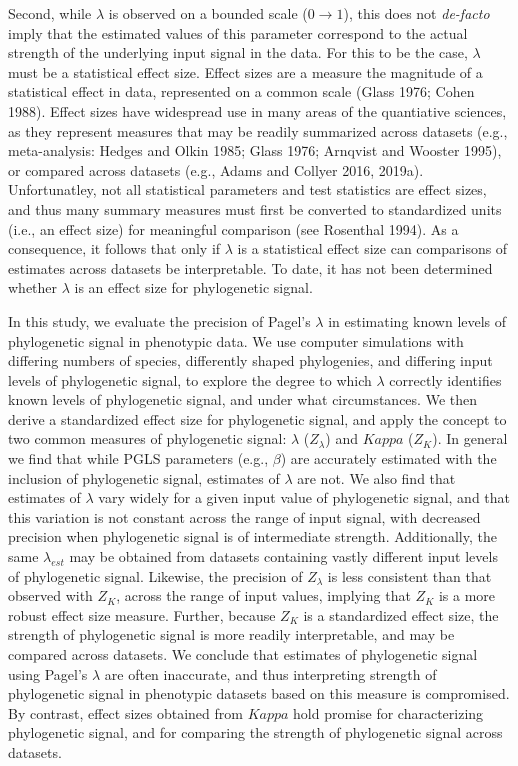 \documentclass[
]{article}
\begin{document}
Second, while \(\lambda\) is observed on a bounded scale (\(0\to1\)),
this does not \emph{de-facto} imply that the estimated values of this
parameter correspond to the actual strength of the underlying input
signal in the data. For this to be the case, \(\lambda\) must be a
statistical effect size. Effect sizes are a measure the magnitude of a
statistical effect in data, represented on a common scale (Glass 1976;
Cohen 1988). Effect sizes have widespread use in many areas of the
quantiative sciences, as they represent measures that may be readily
summarized across datasets (e.g., meta-analysis: Hedges and Olkin 1985;
Glass 1976; Arnqvist and Wooster 1995), or compared across datasets
(e.g., Adams and Collyer 2016, 2019a). Unfortunatley, not all
statistical parameters and test statistics are effect sizes, and thus
many summary measures must first be converted to standardized units
(i.e., an effect size) for meaningful comparison (see Rosenthal 1994).
As a consequence, it follows that only if \(\lambda\) is a statistical
effect size can comparisons of estimates across datasets be
interpretable. To date, it has not been determined whether \(\lambda\)
is an effect size for phylogenetic signal. \hfill\break

In this study, we evaluate the precision of Pagel's \(\lambda\) in
estimating known levels of phylogenetic signal in phenotypic data. We
use computer simulations with differing numbers of species, differently
shaped phylogenies, and differing input levels of phylogenetic signal,
to explore the degree to which \(\lambda\) correctly identifies known
levels of phylogenetic signal, and under what circumstances. We then
derive a standardized effect size for phylogenetic signal, and apply the
concept to two common measures of phylogenetic signal: \(\lambda\)
(\(Z_{\lambda}\)) and \(Kappa\) (\(Z_K\)). In general we find that while
PGLS parameters (e.g., \(\beta\)) are accurately estimated with the
inclusion of phylogenetic signal, estimates of \(\lambda\) are not. We
also find that estimates of \(\lambda\) vary widely for a given input
value of phylogenetic signal, and that this variation is not constant
across the range of input signal, with decreased precision when
phylogenetic signal is of intermediate strength. Additionally, the same
\(\lambda_{est}\) may be obtained from datasets containing vastly
different input levels of phylogenetic signal. Likewise, the precision
of \(Z_{\lambda}\) is less consistent than that observed with \(Z_K\),
across the range of input values, implying that \(Z_K\) is a more robust
effect size measure. Further, because \(Z_K\) is a standardized effect
size, the strength of phylogenetic signal is more readily interpretable,
and may be compared across datasets. We conclude that estimates of
phylogenetic signal using Pagel's \(\lambda\) are often inaccurate, and
thus interpreting strength of phylogenetic signal in phenotypic datasets
based on this measure is compromised. By contrast, effect sizes obtained
from \(Kappa\) hold promise for characterizing phylogenetic signal, and
for comparing the strength of phylogenetic signal across datasets.
\end{document}
